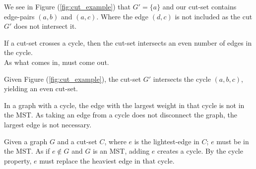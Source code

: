 \noindent
We see in Figure (\ref{fig:cut_example}) that $G'=\{a\}$ and our cut-set contains edge-pairs $(a,b)$ and $(a,c)$. Where the edge $(d,c)$ is not included as the cut $G'$ does not intersect it.
\begin{theo}

    If a cut-set crosses a cycle, then the cut-set intersects an even number of edges in the cycle.\\
    As what comes in, must come out.
\end{theo}
\noindent
Given Figure (\ref{fig:cut_example}), the cut-set $G'$ intersects the cycle $(a,b,c)$, yielding an even cut-set.
\begin{theo}
    
    In a graph with a cycle, the edge with the largest weight in that cycle is not in the MST.
    As taking an edge from a cycle does not disconnect the graph, the largest edge is not necessary.
\end{theo}
\begin{theo}

    Given a graph $G$ and a cut-set $C$, where $e$ is the lightest-edge in $C$; $e$ must be in the MST. As if $e\notin G$ and $G$ is an MST, adding $e$ creates a cycle. By the cycle property, $e$ must replace the heaviest edge in that cycle.
\end{theo}


